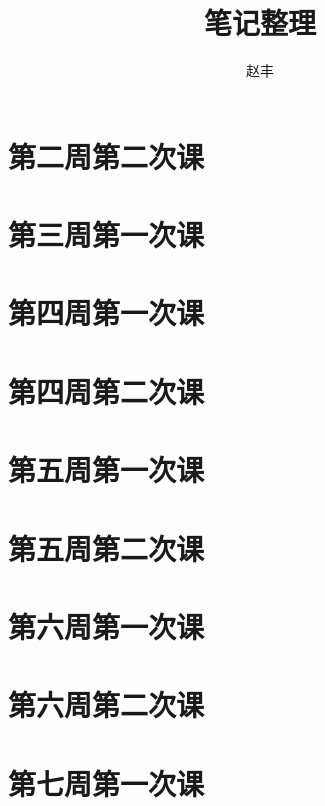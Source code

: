 \documentclass{article}
\numberwithin{equation}{section}
\begin{document}
\title{笔记整理}
\author{赵丰}
\maketitle
\tableofcontents
\section{第二周第二次课}

\section{第三周第一次课}

\section{第四周第一次课}

\section{第四周第二次课}

\section{第五周第一次课}

\section{第五周第二次课}

\section{第六周第一次课}

\section{第六周第二次课}

\section{第七周第一次课}

\end{document}
